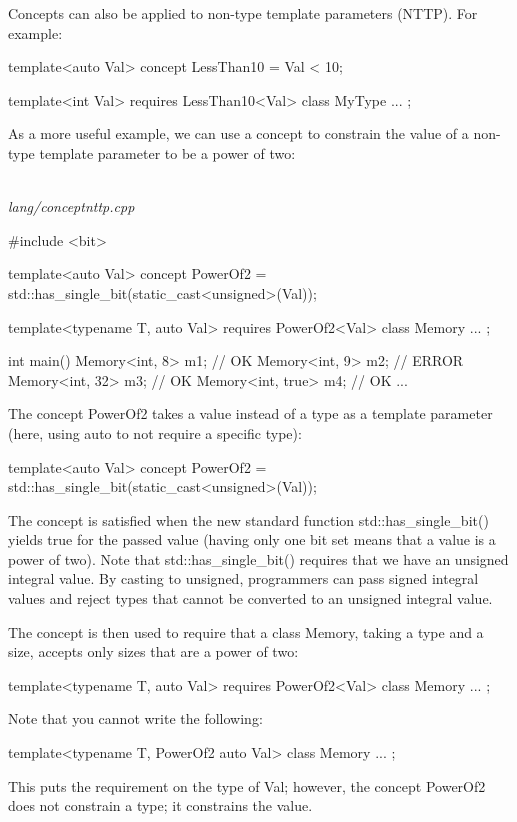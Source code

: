 Concepts can also be applied to non-type template parameters (NTTP). For example:

\begin{cpp}
template<auto Val>
concept LessThan10 = Val < 10;

template<int Val>
requires LessThan10<Val>
class MyType {
	...
};
\end{cpp}

As a more useful example, we can use a concept to constrain the value of a non-type template parameter to be a power of two:

\noindent
\hspace*{\fill} \\ %
\textit{lang/conceptnttp.cpp}

\begin{cpp}
#include <bit>

template<auto Val>
concept PowerOf2 = std::has_single_bit(static_cast<unsigned>(Val));

template<typename T, auto Val>
requires PowerOf2<Val>
class Memory {
	...
};

int main()
{
	Memory<int, 8> m1; // OK
	Memory<int, 9> m2; // ERROR
	Memory<int, 32> m3; // OK
	Memory<int, true> m4; // OK
	...
}
\end{cpp}

The concept PowerOf2 takes a value instead of a type as a template parameter (here, using auto to not require a specific type):

\begin{cpp}
template<auto Val>
concept PowerOf2 = std::has_single_bit(static_cast<unsigned>(Val));
\end{cpp}

The concept is satisfied when the new standard function std::has\_single\_bit() yields true for the passed value (having only one bit set means that a value is a power of two). Note that std::has\_single\_bit() requires that we have an unsigned integral value. By casting to unsigned, programmers can pass signed integral values and reject types that cannot be converted to an unsigned integral value.

The concept is then used to require that a class Memory, taking a type and a size, accepts only sizes that are a power of two:

\begin{cpp}
template<typename T, auto Val>
requires PowerOf2<Val>
class Memory {
	...
};
\end{cpp}

Note that you cannot write the following:


\begin{cpp}
template<typename T, PowerOf2 auto Val>
class Memory {
	...
};
\end{cpp}

This puts the requirement on the type of Val; however, the concept PowerOf2 does not constrain a type; it constrains the value.








